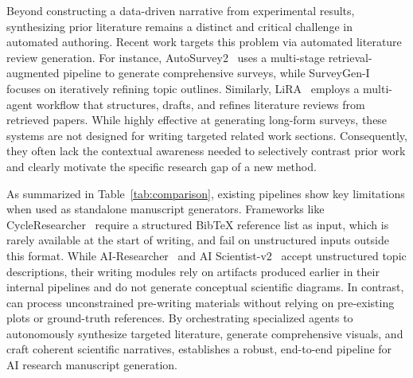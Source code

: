Beyond constructing a data-driven narrative from experimental results, synthesizing prior literature remains a distinct and critical challenge in automated authoring. Recent work targets this problem via automated literature review generation. For instance, AutoSurvey2~\citep{wu2025autosurvey2} uses a multi-stage retrieval-augmented pipeline to generate comprehensive surveys, while SurveyGen-I~\citep{chen2025surveygen} focuses on iteratively refining topic outlines. Similarly, LiRA~\citep{go2025lira} employs a multi-agent workflow that structures, drafts, and refines literature reviews from retrieved papers. While highly effective at generating long-form surveys, these systems are not designed for writing targeted related work sections. Consequently, they often lack the contextual awareness needed to selectively contrast prior work and clearly motivate the specific research gap of a new method. 

As summarized in Table~\ref{tab:comparison}, existing pipelines show key limitations when used as standalone manuscript generators. Frameworks like CycleResearcher~\citep{weng2024cycleresearcher} require a structured BibTeX reference list as input, which is rarely available at the start of writing, and fail on unstructured inputs outside this format. While AI-Researcher~\citep{tang2025ai} and AI Scientist-v2~\citep{yamada2025aiscientistv2} accept unstructured topic descriptions, their writing modules rely on artifacts produced earlier in their internal pipelines and do not generate conceptual scientific diagrams. In contrast, \ourmethod{} can process unconstrained pre-writing materials without relying on pre-existing plots or ground-truth references. By orchestrating specialized agents to autonomously synthesize targeted literature, generate comprehensive visuals, and craft coherent scientific narratives, \ourmethod{} establishes a robust, end-to-end pipeline for AI research manuscript generation.